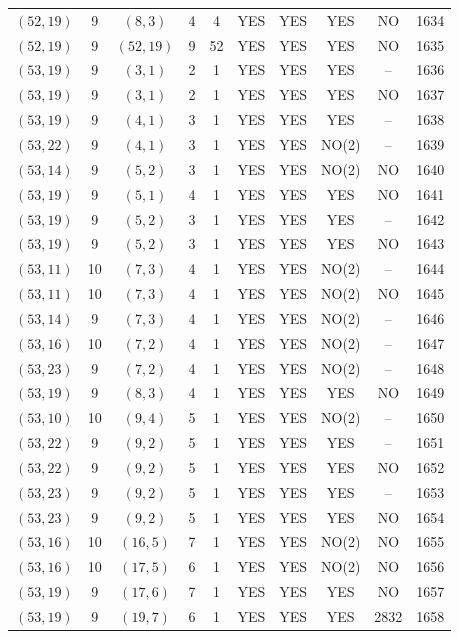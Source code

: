 \begin{longtable}{|c|c|c|c|c|c|c|c|c|c|}
$(52, 19)$ & 9 & $(8, 3)$ & 4 & 4 & YES & YES & YES & NO & 1634\\
$(52, 19)$ & 9 & $(52, 19)$ & 9 & 52 & YES & YES & YES & NO & 1635\\
$(53, 19)$ & 9 & $(3, 1)$ & 2 & 1 & YES & YES & YES & -- & 1636\\
$(53, 19)$ & 9 & $(3, 1)$ & 2 & 1 & YES & YES & YES & NO & 1637\\
$(53, 19)$ & 9 & $(4, 1)$ & 3 & 1 & YES & YES & YES & -- & 1638\\
$(53, 22)$ & 9 & $(4, 1)$ & 3 & 1 & YES & YES & NO(2) & -- & 1639\\
$(53, 14)$ & 9 & $(5, 2)$ & 3 & 1 & YES & YES & NO(2) & NO & 1640\\
$(53, 19)$ & 9 & $(5, 1)$ & 4 & 1 & YES & YES & YES & NO & 1641\\
$(53, 19)$ & 9 & $(5, 2)$ & 3 & 1 & YES & YES & YES & -- & 1642\\
$(53, 19)$ & 9 & $(5, 2)$ & 3 & 1 & YES & YES & YES & NO & 1643\\
$(53, 11)$ & 10 & $(7, 3)$ & 4 & 1 & YES & YES & NO(2) & -- & 1644\\
$(53, 11)$ & 10 & $(7, 3)$ & 4 & 1 & YES & YES & NO(2) & NO & 1645\\
$(53, 14)$ & 9 & $(7, 3)$ & 4 & 1 & YES & YES & NO(2) & -- & 1646\\
$(53, 16)$ & 10 & $(7, 2)$ & 4 & 1 & YES & YES & NO(2) & -- & 1647\\
$(53, 23)$ & 9 & $(7, 2)$ & 4 & 1 & YES & YES & NO(2) & -- & 1648\\
$(53, 19)$ & 9 & $(8, 3)$ & 4 & 1 & YES & YES & YES & NO & 1649\\
$(53, 10)$ & 10 & $(9, 4)$ & 5 & 1 & YES & YES & NO(2) & -- & 1650\\
$(53, 22)$ & 9 & $(9, 2)$ & 5 & 1 & YES & YES & YES & -- & 1651\\
$(53, 22)$ & 9 & $(9, 2)$ & 5 & 1 & YES & YES & YES & NO & 1652\\
$(53, 23)$ & 9 & $(9, 2)$ & 5 & 1 & YES & YES & YES & -- & 1653\\
$(53, 23)$ & 9 & $(9, 2)$ & 5 & 1 & YES & YES & YES & NO & 1654\\
$(53, 16)$ & 10 & $(16, 5)$ & 7 & 1 & YES & YES & NO(2) & NO & 1655\\
$(53, 16)$ & 10 & $(17, 5)$ & 6 & 1 & YES & YES & NO(2) & NO & 1656\\
$(53, 19)$ & 9 & $(17, 6)$ & 7 & 1 & YES & YES & YES & NO & 1657\\
$(53, 19)$ & 9 & $(19, 7)$ & 6 & 1 & YES & YES & YES & 2832 & 1658\\

\end{longtable}
